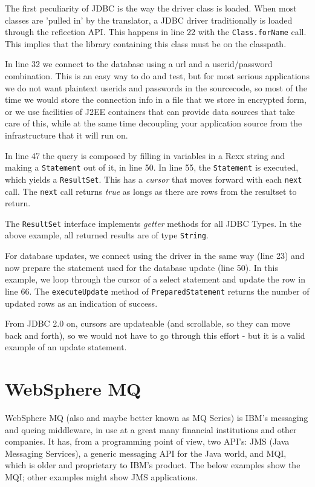 {{The first peculiarity of JDBC is the way the driver class is
loaded. When most classes are 'pulled in' by the translator, a JDBC
driver traditionally is loaded through the reflection API. This
happens in line 22 with the \texttt{Class.forName} call. This implies
that the library containing this class must be on the classpath.

In line 32 we connect to the database using a url and a
userid/password combination. This is an easy way to do and test, but
for most serious applications we do not want plaintext userids and
passwords in the sourcecode, so most of the time we would store the
connection info in a file that we store in encrypted form, or we use
facilities of J2EE containers that can provide data sources that take
care of this, while at the same time decoupling your application
source from the infrastructure that it will run on.

In line 47 the query is composed by filling in variables in a Rexx
string and making a \texttt{Statement} out of it, in line 50. In line
  55, the \texttt{Statement} is executed, which yields a
  \texttt{ResultSet}. This has a \emph{cursor} that moves forward with
  each \texttt{next} call. The \texttt{next} call returns \emph{true}
  as longs as there are rows from the resultset to return.

The \texttt{ResultSet} interface implements \emph{getter} methods for
  all JDBC Types. In the above example, all returned results are of
  type \texttt{String}.

 
For database updates, we connect using the driver in the same way
(line 23) and now prepare the statement used for the database update
(line 50). In this example, we loop through the cursor of a select
statement and update the row in line 66. The \texttt{executeUpdate}
method of \texttt{PreparedStatement} returns the number of updated
rows as an indication of success.

From JDBC 2.0 on, cursors are updateable (and scrollable, so they can
move back and forth), so we would not have to go
through this effort - but it is a valid example of an update statement.
\chapter{WebSphere MQ}
WebSphere MQ (also and maybe better known as MQ Series) is IBM's
messaging and queing middleware, in use at a great many financial
institutions and other companies. It has, from a programming point of
view, two API's: JMS (Java Messaging Services), a generic messaging
API for the Java world, and MQI, which is older and proprietary to
IBM's product. The below examples show the MQI; other examples might
show JMS applications.

}}
